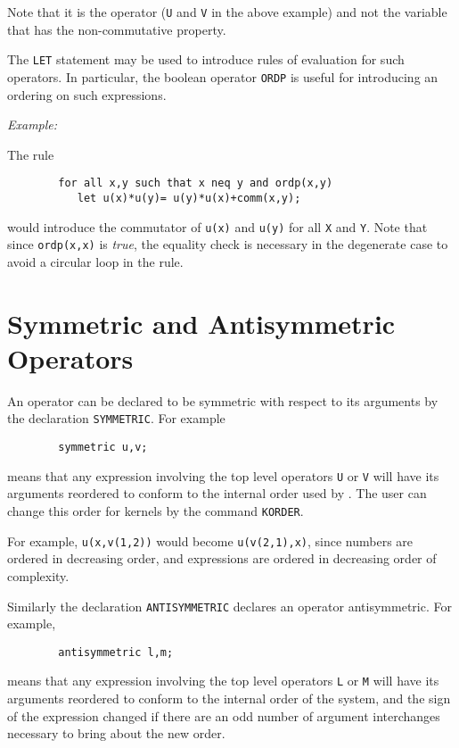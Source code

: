 Note that it is the operator (\texttt{U} and \texttt{V} in the above example)
and not the variable that has the non-commutative property.

The \texttt{LET} statement may be used to introduce rules of
evaluation for such operators.  In particular, the boolean operator
\texttt{ORDP} is useful for introducing an ordering on such
expressions.

\textit{Example:}

The rule
\begin{verbatim}
        for all x,y such that x neq y and ordp(x,y)
           let u(x)*u(y)= u(y)*u(x)+comm(x,y);
\end{verbatim}
would introduce the commutator of \texttt{u(x)} and \texttt{u(y)} for all
\texttt{X} and \texttt{Y}.  Note that since \texttt{ordp(x,x)} is {\em true}, the
equality check is necessary in the degenerate case to avoid a circular
loop in the rule.

\hypertarget{reserved:SYMMETRIC}{\section{Symmetric and Antisymmetric Operators}}

An operator can be declared to be symmetric with respect to its arguments
by the declaration \texttt{SYMMETRIC}. For example
\begin{verbatim}
        symmetric u,v;
\end{verbatim}
means that any expression involving the top level operators \texttt{U} or
\texttt{V} will have its arguments reordered to conform to the internal order
used by {\REDUCE}.  The user can change this order for kernels by the
command \texttt{KORDER}.

For example, \texttt{u(x,v(1,2))} would become \texttt{u(v(2,1),x)}, since
numbers are ordered in decreasing order, and expressions are ordered in
decreasing order of complexity.

Similarly the declaration \texttt{ANTISYMMETRIC}
declares an operator antisymmetric.   For example,
\begin{verbatim}
        antisymmetric l,m;
\end{verbatim}
means that any expression involving the top level operators \texttt{L} or
\texttt{M} will have its arguments reordered to conform to the internal order
of the system, and the sign of the expression changed if there are an odd
number of argument interchanges necessary to bring about the new order.

